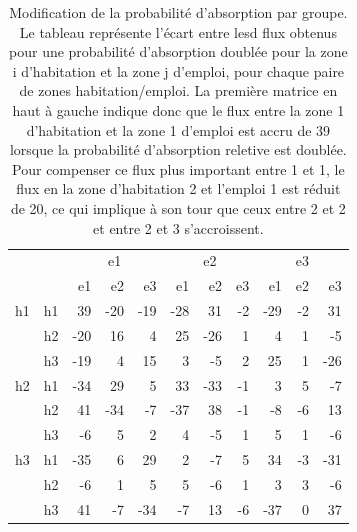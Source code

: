 \documentclass[
  10pt,
  a4paper,
  numbers=noendperiod,
  DIV=12]{scrartcl}
\begin{document}
\hypertarget{tbl-fluxpond}{}
\begin{longtable}{l|lrrrrrrrrr}
\caption{\label{tbl-fluxpond}Modification de la probabilité d'absorption par groupe. Le tableau
représente l'écart entre lesd flux obtenus pour une probabilité
d'absorption doublée pour la zone i d'habitation et la zone j d'emploi,
pour chaque paire de zones habitation/emploi. La première matrice en
haut à gauche indique donc que le flux entre la zone 1 d'habitation et
la zone 1 d'emploi est accru de 39 lorsque la probabilité d'absorption
reletive est doublée. Pour compenser ce flux plus important entre 1 et
1, le flux en la zone d'habitation 2 et l'emploi 1 est réduit de 20, ce
qui implique à son tour que ceux entre 2 et 2 et entre 2 et 3
s'accroissent. }\tabularnewline

\toprule
\multicolumn{1}{l}{} &  & \multicolumn{3}{c}{e1} & \multicolumn{3}{c}{e2} & \multicolumn{3}{c}{e3} \\ 
\cmidrule(lr){3-5} \cmidrule(lr){6-8} \cmidrule(lr){9-11}
\multicolumn{1}{l}{} &  & e1 & e2 & e3 & e1 & e2 & e3 & e1 & e2 & e3 \\ 
\midrule
h1 & h1 & 39 & -20 & -19 & -28 & 31 & -2 & -29 & -2 & 31 \\ 
 & h2 & -20 & 16 & 4 & 25 & -26 & 1 & 4 & 1 & -5 \\ 
 & h3 & -19 & 4 & 15 & 3 & -5 & 2 & 25 & 1 & -26 \\ 
\midrule
h2 & h1 & -34 & 29 & 5 & 33 & -33 & -1 & 3 & 5 & -7 \\ 
 & h2 & 41 & -34 & -7 & -37 & 38 & -1 & -8 & -6 & 13 \\ 
 & h3 & -6 & 5 & 2 & 4 & -5 & 1 & 5 & 1 & -6 \\ 
\midrule
h3 & h1 & -35 & 6 & 29 & 2 & -7 & 5 & 34 & -3 & -31 \\ 
 & h2 & -6 & 1 & 5 & 5 & -6 & 1 & 3 & 3 & -6 \\ 
 & h3 & 41 & -7 & -34 & -7 & 13 & -6 & -37 & 0 & 37 \\ 
\bottomrule
\end{longtable}
\end{document}
